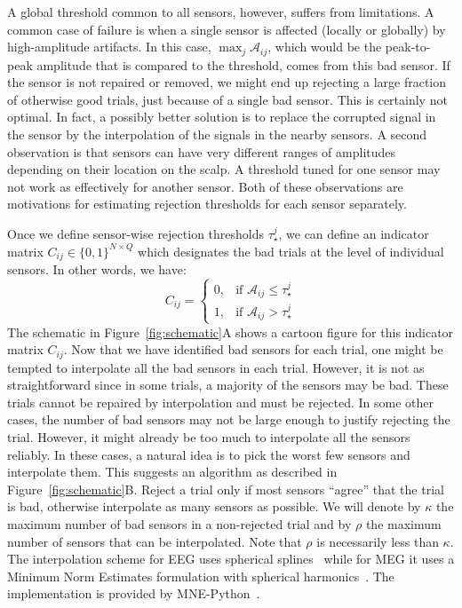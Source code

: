 A global threshold common to all sensors, however, suffers from limitations. A common case of failure is when a single sensor is affected (locally or globally) by high-amplitude artifacts. In this case, $\max_{j} \mathcal{A}_{ij}$, which would be the peak-to-peak amplitude that is compared to the threshold, comes from this bad sensor. If the sensor is not repaired or removed, we might end up rejecting a large fraction of otherwise good trials, just because of a single bad sensor. This is certainly not optimal. In fact, a possibly better solution is to replace the corrupted signal in the sensor by the interpolation of the signals in the nearby sensors. A second observation is that sensors can have very different ranges of amplitudes depending on their location on the scalp. A threshold tuned for one sensor may not work as effectively for another sensor. Both of these observations are motivations for estimating rejection thresholds for each sensor separately.

Once we define sensor-wise rejection thresholds $\tau_{\star}^{j}$, we can define an indicator matrix $C_{ij} \in \{0, 1\}^{N \times Q}$ which designates the bad trials at the level of individual sensors. In other words, we have:
\begin{equation}
C_{ij} = \begin{cases} 
0, & \text{if } \mathcal{A}_{ij} \leq \tau^{j}_{\star} \\
1, & \text{if } \mathcal{A}_{ij} > \tau^{j}_{\star}
\end{cases}
\end{equation}
The schematic in Figure~\ref{fig:schematic}A shows a cartoon figure for this indicator matrix $C_{ij}$. Now that we have identified bad sensors for each trial, one might be tempted to interpolate all the bad sensors in each trial. However, it is not as straightforward since in some trials, a majority of the sensors may be bad. These trials cannot be repaired by interpolation and must be rejected. In some other cases, the number of bad sensors may not be large enough to justify rejecting the trial. However, it might already be too much to interpolate all the sensors reliably. In these cases, a natural idea is to pick the worst few sensors and interpolate them. This suggests an algorithm as described in Figure~\ref{fig:schematic}B. Reject a trial only if most sensors ``agree'' that the trial is bad, otherwise interpolate as many sensors as possible. We will denote by $\kappa$ the maximum number of bad sensors in a non-rejected trial and by $\rho$ the maximum number of sensors that can be interpolated. Note that $\rho$ is necessarily less than $\kappa$. The interpolation scheme for EEG uses spherical splines~\citep{perrin1989spherical} while for MEG it uses a Minimum Norm Estimates formulation with spherical harmonics~\citep{hamalainen1994interpreting}. The implementation is provided by MNE-Python~\citep{gramfort2013meg}.

